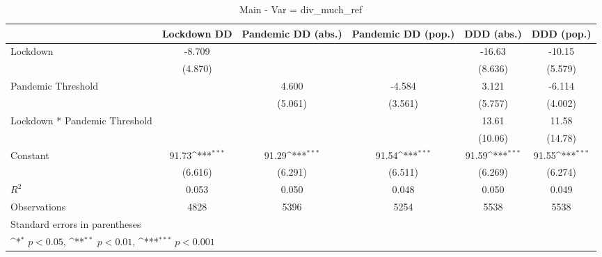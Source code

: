 \documentclass{article}
\begin{document}
{
\def\sym#1{\ifmmode^{#1}\else\(^{#1}\)\fi}
\begin{longtable}{l*{5}{c}}
\caption{Main - Var = div\_much\_ref}\\
\hline\hline\endfirsthead\hline\endhead\hline\endfoot\endlastfoot
                &\multicolumn{1}{c}{Lockdown DD}&\multicolumn{1}{c}{Pandemic DD (abs.)}&\multicolumn{1}{c}{Pandemic DD (pop.)}&\multicolumn{1}{c}{DDD (abs.)}&\multicolumn{1}{c}{DDD (pop.)}\\
\hline
Lockdown        &   -8.709         &                  &                  &   -16.63         &   -10.15         \\
                &  (4.870)         &                  &                  &  (8.636)         &  (5.579)         \\
Pandemic Threshold&                  &    4.600         &   -4.584         &    3.121         &   -6.114         \\
                &                  &  (5.061)         &  (3.561)         &  (5.757)         &  (4.002)         \\
Lockdown * Pandemic Threshold&                  &                  &                  &    13.61         &    11.58         \\
                &                  &                  &                  &  (10.06)         &  (14.78)         \\
Constant        &    91.73\sym{***}&    91.29\sym{***}&    91.54\sym{***}&    91.59\sym{***}&    91.55\sym{***}\\
                &  (6.616)         &  (6.291)         &  (6.511)         &  (6.269)         &  (6.274)         \\
\hline
\(R^{2}\)       &    0.053         &    0.050         &    0.048         &    0.050         &    0.049         \\
Observations    &     4828         &     5396         &     5254         &     5538         &     5538         \\
\hline\hline
\multicolumn{6}{l}{\footnotesize Standard errors in parentheses}\\
\multicolumn{6}{l}{\footnotesize \sym{*} \(p<0.05\), \sym{**} \(p<0.01\), \sym{***} \(p<0.001\)}\\
\end{longtable}
}
\end{document}
